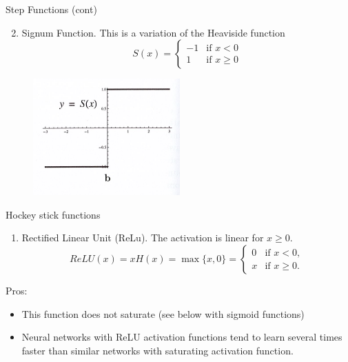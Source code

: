 \documentclass{beamer}
\begin{document}
\begin{frame}{Step Functions (cont)}
	\begin{enumerate}
		\setcounter{enumi}{1}
		\item Signum Function. This is a variation of the Heaviside function
		\begin{equation*}
			S(x)= \begin{cases}
				-1 & \text{if } x <0 \\
				1 & \text{if } x \ge 0
			\end{cases}
		\end{equation*}
	\end{enumerate}
\begin{figure}[h]
	\centering
	\includegraphics[scale=0.8]{../../Figures/fig_activation_22b}
\end{figure}
\end{frame}

\begin{frame}{Hockey stick functions}
	\begin{enumerate}
		\item Rectified Linear Unit (ReLu). The activation is linear for $x\ge 0$.
		\begin{equation*}
			ReLU(x)= x H(x)= \max \{ x, 0\} = \begin{cases}
				0 & \text{if } x <0,\\
				x & \text{if } x \ge 0.
			\end{cases}
		\end{equation*}
	\end{enumerate}
Pros:
\begin{itemize}
	\item This function does not saturate (see below with sigmoid functions)
	\item Neural networks with ReLU activation functions tend to learn several times faster than similar networks with saturating activation function.
\end{itemize}

\end{frame}
\end{document}
